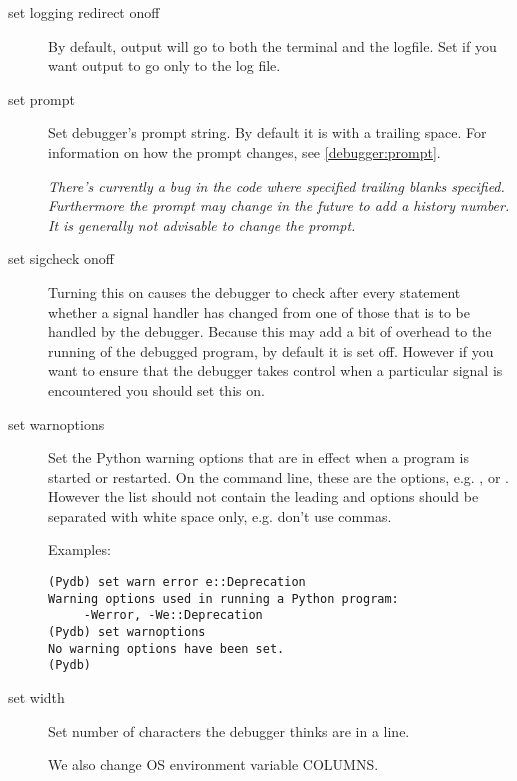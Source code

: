 \begin{description}
\item[set logging redirect on\code{\Large{|}}off]\label{command:log-redirect}

By default,  output will go to both the terminal and the
logfile.  Set  if you want output to go only to the log
file.

\item[set prompt ]\label{command:prompt}

Set debugger's prompt string. By default it is  with
a trailing space. For information on how the prompt
changes, see \ref{debugger:prompt}.

\emph{There's currently a bug in the code where specified trailing
blanks specified. Furthermore the prompt may change in the future to
add a history number. It is generally not advisable to change the
prompt.}

\item[set sigcheck on\code{\Large{|}}off]\label{command:sigwatch}

Turning this on causes the debugger to check after every statement
whether a signal handler has changed from one of those that is to be
handled by the debugger. Because this may add a bit of overhead to the
running of the debugged program, by default it is set off. However if
you want to ensure that the debugger takes control when a particular
signal is encountered you should set this on.

%

\item[set warnoptions ]\label{command:warnopts}

Set the Python warning options that are in effect when a program is started
or restarted. On the command line, these are the  options,
e.g. , or . However the list
should not contain the leading  and options should be
separated with white space only, e.g. don't use commas. 

Examples:
\begin{verbatim}
(Pydb) set warn error e::Deprecation
Warning options used in running a Python program:
	 -Werror, -We::Deprecation
(Pydb) set warnoptions
No warning options have been set.
(Pydb) 
\end{verbatim}

\item[set width {}]\label{command:width}

Set number of characters the debugger thinks are in a line.

We also change OS environment variable COLUMNS. 
\end{description}

